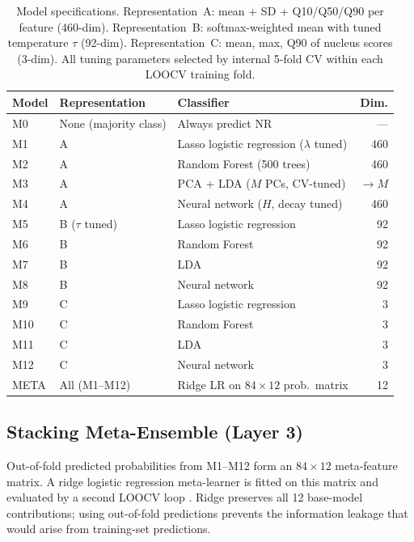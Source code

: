 \documentclass[12pt, onecolumn]{article}
\begin{document}
\begin{table}[H]
\centering
\caption{Model specifications. Representation~A: mean + SD +
  Q10/Q50/Q90 per feature (460-dim). Representation~B:
  softmax-weighted mean with tuned temperature $\tau$ (92-dim).
  Representation~C: mean, max, Q90 of nucleus scores (3-dim).
  All tuning parameters selected by internal 5-fold CV within
  each LOOCV training fold.}
\label{tab:models}
\small
\setlength{\tabcolsep}{5pt}
\renewcommand{\arraystretch}{1.25}
\begin{tabularx}{\textwidth}{llXr}
\toprule
\textbf{Model} & \textbf{Representation} & \textbf{Classifier}
  & \textbf{Dim.} \\
\midrule
M0  & None (majority class) & Always predict NR & --- \\
\midrule
M1  & A & Lasso logistic regression ($\lambda$ tuned) & 460 \\
M2  & A & Random Forest (500 trees)                   & 460 \\
M3  & A & PCA + LDA ($M$ PCs, CV-tuned)               & $\to M$ \\
M4  & A & Neural network ($H$, decay tuned)            & 460 \\
\midrule
M5  & B ($\tau$ tuned) & Lasso logistic regression & 92 \\
M6  & B & Random Forest                             & 92 \\
M7  & B & LDA                                       & 92 \\
M8  & B & Neural network                            & 92 \\
\midrule
M9  & C & Lasso logistic regression & 3 \\
M10 & C & Random Forest             & 3 \\
M11 & C & LDA                       & 3 \\
M12 & C & Neural network            & 3 \\
\midrule
META & All (M1--M12) & Ridge LR on $84\times12$ prob.\ matrix & 12 \\
\bottomrule
\end{tabularx}
\end{table}

\subsection{Stacking Meta-Ensemble (Layer 3)}

Out-of-fold predicted probabilities from M1--M12 form an
$84\times12$ meta-feature matrix. A ridge logistic regression
meta-learner is fitted on this matrix and evaluated by a second
LOOCV loop \citep{wolpert1992}. Ridge preserves all 12 base-model
contributions; using out-of-fold predictions prevents the
information leakage that would arise from training-set predictions.
\end{document}
